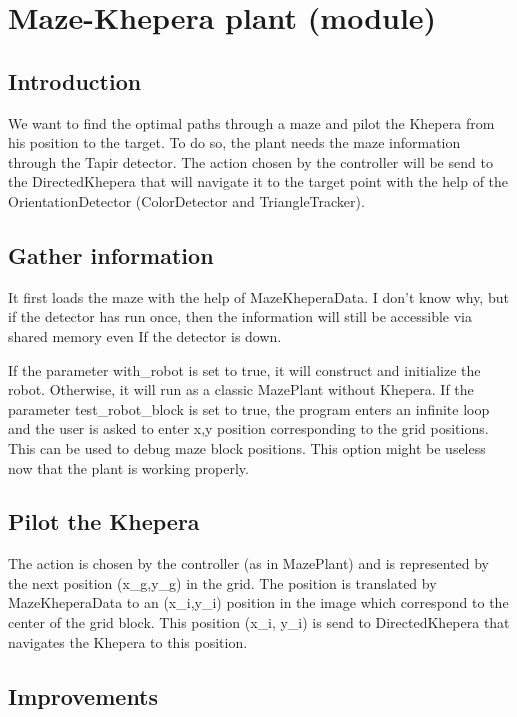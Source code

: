 \section{Maze-Khepera plant (module)}

\subsection{Introduction}

We want to find the optimal paths through a maze and pilot the Khepera 
from his position to the target. To do so, the plant needs the maze 
information through the Tapir detector. The action chosen by the 
controller will be send to the DirectedKhepera that will navigate it 
to the target point with the help of the OrientationDetector 
(ColorDetector and TriangleTracker).

\subsection{Gather information}

It first loads the maze with the help of MazeKheperaData. I don’t know 
why, but if the detector has run once, then the information will still 
be accessible via shared memory even If the detector is down. 

If the parameter with\_robot is set to true, it will construct and 
initialize the robot. Otherwise, it will run as a classic MazePlant 
without Khepera.
If the parameter test\_robot\_block is set to true, the program enters an 
infinite loop and the user is asked to enter x,y position corresponding 
to the grid positions. This can be used to debug maze block positions. 
This option might be useless now that the plant is working properly.

\subsection{Pilot the Khepera}

The action is chosen by the controller (as in MazePlant) and 
is represented by the next position (x\_g,y\_g) in the grid. 
The position is translated by MazeKheperaData to an (x\_i,y\_i) position 
in the image which correspond to the center of the grid block. This 
position (x\_i, y\_i) is send to DirectedKhepera that navigates the 
Khepera to this position.

\subsection{Improvements}

